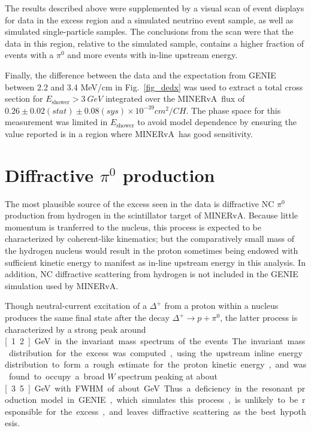 \documentclass[%
preprint,
 amsmath,amssymb,
 aps,
]{revtex4-1}
\newcommand{\minerva}{\mbox{MINERvA}}
\begin{document}
The results described above were supplemented by a visual scan of event displays for data in the excess region and a simulated neutrino event sample, as well as simulated single-particle samples.  The conclusions from the scan were that the data in this region, relative to the simulated sample, contains a higher fraction of events with a $\pi^{0}$ and more events with in-line upstream energy.  

Finally, the difference between the data and the expectation from GENIE between 2.2 and 3.4 MeV/cm in Fig.~\ref{fig_dedx} was used to extract a total cross section for $E_{\mathrm{shower}} > 3~GeV$ integrated over the \minerva\ flux of $0.26 \pm 0.02 (stat) \pm 0.08 (sys) \times 10^{-39} cm^{2}/CH$. The phase space for this measurement was limited in $E_{\mathrm{shower}}$ to avoid model dependence by ensuring the value reported is in a region where \minerva\ has good sensitivity. 


\section{\label{source}Diffractive $\pi^{0}$ production}
The most plausible source of the excess seen in the data is diffractive NC $\pi^{0}$ production from hydrogen in the scintillator target of \minerva .  Because little momentum is tranferred to the nucleus, this process is expected to be characterized by coherent-like kinematics; but the comparatively small mass of the hydrogen nucleus would result in the proton sometimes being endowed with sufficient kinetic energy to manifest as in-line upstream energy in this analysis.  In addition, NC diffractive scattering from hydrogen is not included in the GENIE simulation used by \minerva .  

Though neutral-current excitation of a $\Delta^{+}$ from a proton within a nucleus produces the same final state after the decay $\Delta^{+} \rightarrow p + \pi^{0}$, the latter process is characterized by a strong peak around \unit[1.2]{GeV} in the invariant mass spectrum of the events.  The invariant mass distribution for the excess was computed, using the upstream inline energy distribution to form a rough estimate for the proton kinetic energy, and was found to occupy a broad $W$ spectrum peaking at about \unit[3.5]{GeV} with FWHM of about \unit[3]{GeV}.  Thus a deficiency in the resonant production model in GENIE, which simulates this process, is unlikely to be responsible for the excess, and leaves diffractive scattering as the best hypothesis.
\end{document}
